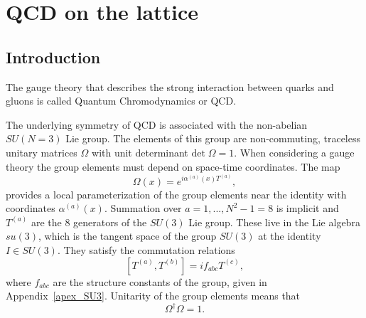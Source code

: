\chapter{QCD on the lattice}%


\label{ch_foundation}


\section{Introduction}
\label{ch_foundation:sec:general}

The gauge theory that describes the strong interaction between quarks and gluons is called Quantum Chromodynamics or QCD. 

The underlying symmetry of QCD is associated with the non-abelian $SU(N=3)$ Lie group. The elements of this group are non-commuting, traceless unitary matrices $\Omega$ with unit determinant $\textrm{det}\;\Omega=1$. When considering a gauge theory the group elements must depend on space-time coordinates. The map
\begin{equation}
\Omega(x)=e^{i\alpha^{(a)}(x)T^{(a)}},
\end{equation}
provides a local parameterization of the group elements near the identity with coordinates $\alpha^{(a)}(x)$. Summation over $a=1,...,N^2-1=8$ is implicit and $T^{(a)}$ are the 8 generators of the $SU(3)$ Lie group. These live in the Lie algebra $su(3)$, which is the tangent space of the group $SU(3)$ at the identity $I\in SU(3)$. They satisfy the commutation relations
\begin{equation}
\left[T^{(a)}, T^{(b)}\right]=if_{abc}T^{(c)},
\end{equation}
where $f_{abc}$ are the structure constants of the group, given in Appendix~\ref{apex_SU3}. Unitarity of the group elements means that
\begin{equation}
\Omega^{\dagger}\Omega=1.
\end{equation}

